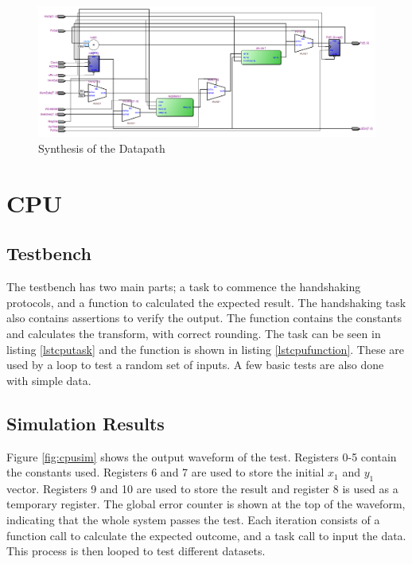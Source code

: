 \begin{figure}
\includegraphics[width=\textwidth]{Figures/datapathsynth.png}
\caption{Synthesis of the Datapath}
\label{fig:datapathsynth}
\end{figure}


\section{CPU}
\subsection{Testbench}

The testbench has two main parts; a task to commence the handshaking protocols, and a function to calculated the expected result. 
The handshaking task also contains assertions to verify the output. 
The function contains the constants and calculates the transform, with correct rounding.
The task can be seen in listing \ref{lstcputask} and the function is shown in listing \ref{lstcpufunction}.
These are used by a loop to test a random set of inputs. 
A few basic tests are also done with simple data. 







\subsection{Simulation Results}

Figure \ref{fig:cpusim} shows the output waveform of the test. 
Registers 0-5 contain the constants used. 
Registers 6 and 7 are used to store the initial $x_1$ and $y_1$ vector. 
Registers 9 and 10 are used to store the result and register 8 is used as a temporary register. 
The global error counter is shown at the top of the waveform, indicating that the whole system passes the test. 
Each iteration consists of a function call to calculate the expected outcome, and a task call to input the data. 
This process is then looped to test different datasets. 

